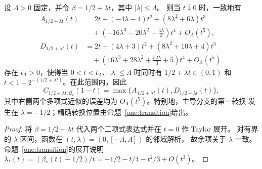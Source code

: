 \begin{proposition}[临界窗口的统一展开]\label{one:critical-window}
设 $\Lambda>0$ 固定，并令 $\beta=1/2+\lambda t$，其中 $|\lambda|\le\Lambda$。
则当 $t\downarrow0$ 时，一致地有
\[
 \begin{aligned}
 A_{1/2+\lambda t}(t)
 &=2t+(-4\lambda-1)t^2+(8\lambda^2+6\lambda)t^3\\
 &\quad+\left(-16\lambda^3-20\lambda^2-\frac{4\lambda}{3}\right)t^4
 +O_\Lambda(t^5),\\
 D_{1/2+\lambda t}(t)
 &=2t+(4\lambda+3)t^2+(8\lambda^2+10\lambda+4)t^3\\
 &\quad+\left(16\lambda^3+28\lambda^2+\frac{52\lambda}{3}+5\right)t^4
 +O_\Lambda(t^5).
 \end{aligned}
\]
存在 $t_\Lambda>0$，使得当 $0<t<t_\Lambda$、$|\lambda|\le\Lambda$ 时同时有
$1/2+\lambda t\in(0,1)$ 和 $t<1-2^{-(1/2+\lambda t)}$。在此范围内，因此
\[
 C_{1/2+\lambda t,\mathcal Q_c}(1-t)
 =\max\{A_{1/2+\lambda t}(t),D_{1/2+\lambda t}(t)\},
\]
其中右侧两个多项式近似的误差均为 $O_\Lambda(t^5)$。特别地，主导分支的第一转换
发生在 $\lambda=-1/2$；精确转换位置由命题~\ref{one:transition}给出。
\end{proposition}

\begin{proof}
将 $\beta=1/2+\lambda t$ 代入两个二项式表达式并在 $t=0$ 作 Taylor 展开。
对有界的 $\lambda$ 区间，函数在 $(t,\lambda)=(0,[-\Lambda,\Lambda])$ 的邻域解析，
故余项关于 $\lambda$ 一致。命题~\ref{one:transition}的展开说明
$\lambda_*(t)=(\beta_*(t)-1/2)/t=-1/2-t/4-t^2/3+O(t^3)$。
\end{proof}
